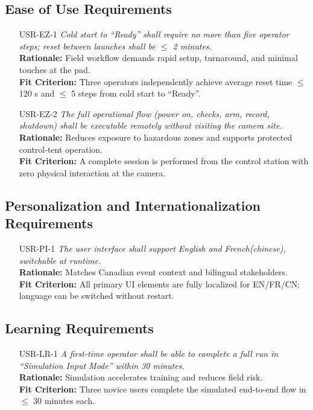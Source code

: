 \documentclass[12pt]{article}
\begin{document}
\subsection{Ease of Use Requirements}
\begin{itemize}[leftmargin=*]
  \item[USR-EZ-1] \emph{Cold start to “Ready” shall require no more than five operator
          steps; reset between launches shall be $\leq$ 2 minutes.}\\ \textbf{Rationale:}
        Field workflow demands rapid setup, turnaround, and minimal touches at the
        pad.\\ \textbf{Fit Criterion:} Three operators independently achieve average
        reset time $\leq$ 120 s and $\leq$ 5 steps from cold start to “Ready”.

  \item[USR-EZ-2] \emph{The full operational flow (power on, checks, arm, record,
          shutdown) shall be executable remotely without visiting the camera site.}\\
        \textbf{Rationale:} Reduces exposure to hazardous zones and supports protected
        control-tent operation.\\ \textbf{Fit Criterion:} A complete session is
        performed from the control station with zero physical interaction at the
        camera.
\end{itemize}

\subsection{Personalization and Internationalization Requirements}
\begin{itemize}[leftmargin=*]
  \item[USR-PI-1] \emph{The user interface shall support English and French(chinese),
          switchable at runtime.}\\ \textbf{Rationale:} Matches Canadian event context
        and bilingual stakeholders.\\ \textbf{Fit Criterion:} All primary UI elements
        are fully localized for EN/FR/CN; language can be switched without restart.
\end{itemize}

\subsection{Learning Requirements}
\begin{itemize}[leftmargin=*]
  \item[USR-LR-1] \emph{A first-time operator shall be able to complete a full run in
          “Simulation Input Mode” within 30 minutes.}\\ \textbf{Rationale:} Simulation
        accelerates training and reduces field risk.\\ \textbf{Fit Criterion:} Three
        novice users complete the simulated end-to-end flow in $\leq$ 30 minutes each.
\end{itemize}
\end{document}
